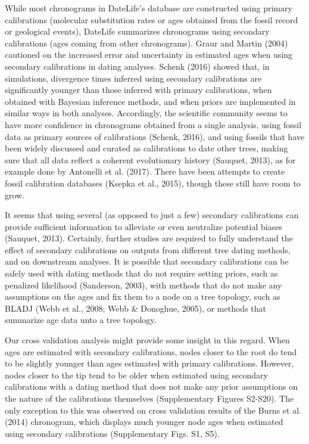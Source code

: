 \documentclass[english,man]{apa6}
\begin{document}
While most chronograms in DateLife's database are constructed using primary calibrations (molecular substitution rates or ages obtained from the fossil record or geological events), DateLife summarizes chronograms using secondary calibrations (ages coming from other chronograms).
Graur and Martin (2004) cautioned on the increased error and uncertainty in estimated ages when using secondary calibrations in dating analyses.
Schenk (2016) showed that, in simulations, divergence times inferred using secondary calibrations are significantly younger than those inferred with primary calibrations, when obtained with Bayesian inference methods, and when priors are implemented in similar ways in both analyses.
Accordingly, the scientific community seems to have more confidence in chronograms obtained from a single analysis, using fossil data as primary sources of calibrations (Schenk, 2016), and using fossils that have been widely discussed and curated as calibrations to date other trees, making sure that all data reflect a coherent evolutionary history (Sauquet, 2013), as for example done by Antonelli et al. (2017).
There have been attempts to create fossil calibration databases (Ksepka et al., 2015), though these still have room to grow.

It seems that using several (as opposed to just a few) secondary calibrations can provide sufficient information to alleviate or even neutralize potential biases (Sauquet, 2013).
Certainly, further studies are required to fully understand the effect of secondary calibrations on outputs from different tree dating methods, and on downstream analyses. It is possible that secondary calibrations can be safely used with dating methods that do not require setting priors, such as penalized likelihood (Sanderson, 2003), with methods that do not make any assumptions on the ages and fix them to a node on a tree topology, such as BLADJ (Webb et al., 2008; Webb \& Donoghue, 2005), or methods that summarize age data unto a tree topology.

Our cross validation analysis might provide some insight in this regard. When ages are estimated with secondary calibrations, nodes closer to the root do tend to be slightly younger than ages estimated with primary calibrations. However, nodes closer to the tip tend to be older when estimated using secondary calibrations with a dating method that does not make any prior assumptions on the nature of the calibrations themselves (Supplementary Figures S2-S20). The only exception to this was observed on cross validation results of the Burns et al. (2014) chronogram, which displays much younger node ages when estimated using secondary calibrations (Supplementary Figs. S1, S5).
\end{document}
